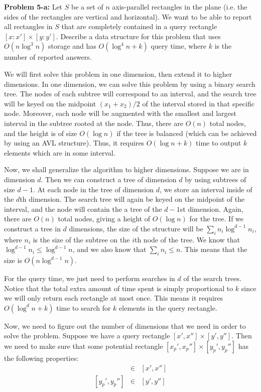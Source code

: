 \documentclass[psamsfonts]{amsart}
\newenvironment{sol}{\vspace{0.25cm}{\large \bfseries Solution:}}{\qedsymbol}
\newenvironment{prob}[1]{\begin{framed}{\large \bfseries Problem #1:}}{\end{framed}}
\begin{document}
\begin{prob}{5-a}
Let $S$ be a set of $n$ axis-parallel rectangles in the plane (i.e. the sides of the rectangles are vertical and horizontal). We want to be able to report all rectangles in $S$ that are completely contained in a query rectangle $[x: x'] \times [y : y']$. Describe a data structure for this problem that uses $O(n \log^3 n)$ storage and has $O(\log^4 n + k)$ query time, where $k$ is the number of reported answers.
\end{prob}
\begin{sol}
We will first solve this problem in one dimension, then extend it to higher dimensions. In one dimension, we can solve this problem by using a binary search tree. The nodes of each subtree will correspond to an interval, and the search tree will be keyed on the midpoint $(x_1 + x_2)/2$ of the interval stored in that specific node. Moreover, each node will be augmented with the smallest and largest interval in the subtree rooted at the node. Thus, there are $O(n)$ total nodes, and the height is of size $O(\log n)$ if the tree is balanced (which can be achieved by using an AVL structure). Thus, it requires $O(\log n + k)$ time to output $k$ elements which are in some interval. 

Now, we shall generalize the algorithm to higher dimensions. Suppose we are in dimension $d$. Then we can construct a tree of dimension $d$ by using subtrees of size $d-1$. At each node in the tree of dimension $d$, we store an interval inside of the $d$th dimension. The search tree will again be keyed on the midpoint of the interval, and the node will contain the a tree of the $d-1$st dimension. Again, there are $O(n)$ total nodes, giving a height of $O(\log n)$ for the tree. If we construct a tree in $d$ dimensions, the size of the structure will be $\sum_{i} n_i \log^{d-1} n_i$, where $n_i$ is the size of the subtree on the $i$th node of the tree. We know that $\log^{d-1} n_i \leq \log^{d-1} n$, and we also know that $\sum_{i} n_i \leq n$. This means that the size is $O(n \log^{d-1} n)$. 

For the query time, we just need to perform searches in $d$ of the search trees. Notice that the total extra amount of time spent is simply proportional to $k$ since we will only return each rectangle at most once. This means it requires $O(\log^d n + k)$ time to search for $k$ elements in the query rectangle. 

Now, we need to figure out the number of dimensions that we need in order to solve the problem. Suppose we have a query rectangle $[x', x''] \times [y', y'']$. Then we need to make sure that some potential rectangle $[x_p', x_p''] \times [y_p', y_p'']$ has the following properties:
\begin{eqnarray}
[x_p', x_p''] &\in& [x', x''] \\
\left[y_p', y_p'' \right] &\in& [y', y'']
\end{eqnarray}


\end{sol}
\end{document}
